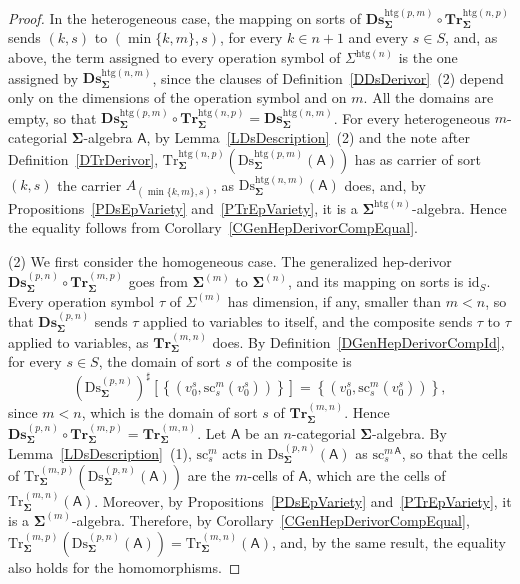 \documentclass[a4paper, reqno]{amsbook}
\newcommand{\sig}[1]{\mathbf{#1}}             %
\newcommand{\calg}[1]{\boldsymbol{\mathsf{#1}}} %
\newcommand{\htg}{\mathrm{htg}}                %
\newcommand{\id}{\mathrm{id}}
\newcommand{\src}{\mathrm{sc}}
\newcommand{\Ds}{\mathrm{Ds}}
\newcommand{\Tr}{\mathrm{Tr}}
\newcommand{\bDs}{\mathbf{Ds}}
\newcommand{\bTr}{\mathbf{Tr}}
\theoremstyle{plain}
\theoremstyle{definition}
\begin{document}
\begin{proof}
In the heterogeneous case, the mapping on sorts of $\bDs^{\htg(p,m)}_{\sig{\Sigma}}\circ\bTr^{\htg(n,p)}_{\sig{\Sigma}}$ sends $(k,s)$ to $(\min\{k,m\},s)$, for every $k\in n+1$ and every $s\in S$, and, as above, the term assigned to every operation symbol of $\Sigma^{\htg(n)}$ is the one assigned by $\bDs^{\htg(n,m)}_{\sig{\Sigma}}$, since the clauses of Definition~\ref{DDsDerivor}~(2) depend only on the dimensions of the operation symbol and on $m$.
All the domains are empty, so that $\bDs^{\htg(p,m)}_{\sig{\Sigma}}\circ\bTr^{\htg(n,p)}_{\sig{\Sigma}}=\bDs^{\htg(n,m)}_{\sig{\Sigma}}$.
For every heterogeneous $m$-categorial $\sig{\Sigma}$-algebra $\calg{A}$, by Lemma~\ref{LDsDescription}~(2) and the note after Definition~\ref{DTrDerivor}, $\Tr^{\htg(n,p)}_{\sig{\Sigma}}(\Ds^{\htg(p,m)}_{\sig{\Sigma}}(\calg{A}))$ has as carrier of sort $(k,s)$ the carrier $A_{(\min\{k,m\},s)}$, as $\Ds^{\htg(n,m)}_{\sig{\Sigma}}(\calg{A})$ does, and, by Propositions~\ref{PDsEpVariety} and~\ref{PTrEpVariety}, it is a $\sig{\Sigma}^{\htg(n)}$-algebra.
Hence the equality follows from Corollary~\ref{CGenHepDerivorCompEqual}.

(2) We first consider the homogeneous case.
The generalized hep-derivor $\bDs^{(p,n)}_{\sig{\Sigma}}\circ\bTr^{(m,p)}_{\sig{\Sigma}}$ goes from $\sig{\Sigma}^{(m)}$ to $\sig{\Sigma}^{(n)}$, and its mapping on sorts is $\id_{S}$.
Every operation symbol $\tau$ of $\Sigma^{(m)}$ has dimension, if any, smaller than $m<n$, so that $\bDs^{(p,n)}_{\sig{\Sigma}}$ sends $\tau$ applied to variables to itself, and the composite sends $\tau$ to $\tau$ applied to variables, as $\bTr^{(m,n)}_{\sig{\Sigma}}$ does.
By Definition~\ref{DGenHepDerivorCompId}, for every $s\in S$, the domain of sort $s$ of the composite is
\[
\left(\Ds^{(p,n)}_{\sig{\Sigma}}\right)^{\sharp}\left[\left\lbrace\left(v^{s}_{0},\src^{m}_{s}(v^{s}_{0})\right)\right\rbrace\right]=\left\lbrace\left(v^{s}_{0},\src^{m}_{s}(v^{s}_{0})\right)\right\rbrace,
\]
since $m<n$, which is the domain of sort $s$ of $\bTr^{(m,n)}_{\sig{\Sigma}}$.
Hence $\bDs^{(p,n)}_{\sig{\Sigma}}\circ\bTr^{(m,p)}_{\sig{\Sigma}}=\bTr^{(m,n)}_{\sig{\Sigma}}$.
Let $\calg{A}$ be an $n$-categorial $\sig{\Sigma}$-algebra.
By Lemma~\ref{LDsDescription}~(1), $\src^{m}_{s}$ acts in $\Ds^{(p,n)}_{\sig{\Sigma}}(\calg{A})$ as $\src^{m\,\calg{A}}_{s}$, so that the cells of $\Tr^{(m,p)}_{\sig{\Sigma}}(\Ds^{(p,n)}_{\sig{\Sigma}}(\calg{A}))$ are the $m$-cells of $\calg{A}$, which are the cells of $\Tr^{(m,n)}_{\sig{\Sigma}}(\calg{A})$.
Moreover, by Propositions~\ref{PDsEpVariety} and~\ref{PTrEpVariety}, it is a $\sig{\Sigma}^{(m)}$-algebra.
Therefore, by Corollary~\ref{CGenHepDerivorCompEqual}, $\Tr^{(m,p)}_{\sig{\Sigma}}(\Ds^{(p,n)}_{\sig{\Sigma}}(\calg{A}))=\Tr^{(m,n)}_{\sig{\Sigma}}(\calg{A})$, and, by the same result, the equality also holds for the homomorphisms.


\end{proof}
\end{document}
